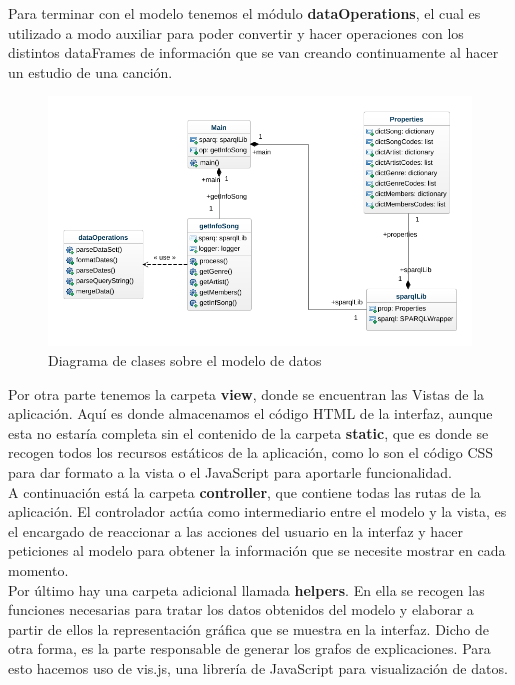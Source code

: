 Para terminar con el modelo tenemos el módulo \textbf{dataOperations}, el cual es utilizado a modo auxiliar para poder convertir y hacer operaciones con los distintos dataFrames de información que se van creando continuamente al hacer un estudio de una canción.\\

\begin{figure}[h!]
	\centering
	\includegraphics[width = 1\textwidth]{Imagenes/Bitmap/class-diagram.png}
	\caption{Diagrama de clases sobre el modelo de datos}
	\label{fig:sampleImage}
\end{figure}

Por otra parte tenemos la carpeta \textbf{view}, donde se encuentran las Vistas de la aplicación. Aquí es donde almacenamos el código HTML de la interfaz, aunque esta no estaría completa sin el contenido de la carpeta \textbf{static}, que es donde se recogen todos los recursos estáticos de la aplicación, como lo son el código CSS para dar formato a la vista o el JavaScript para aportarle funcionalidad. \\

A continuación está la carpeta \textbf{controller}, que contiene todas las rutas de la aplicación. El controlador actúa como intermediario entre el modelo y la vista, es el encargado de reaccionar a las acciones del usuario en la interfaz y hacer peticiones al modelo para obtener la información que se necesite mostrar en cada momento. \\

Por último hay una carpeta adicional llamada \textbf{helpers}. En ella se recogen las funciones necesarias para tratar los datos obtenidos del modelo y elaborar a partir de ellos la representación gráfica que se muestra en la interfaz. Dicho de otra forma, es la parte responsable de generar los grafos de explicaciones. Para esto hacemos uso de vis.js, una librería de JavaScript para visualización de datos. \\


